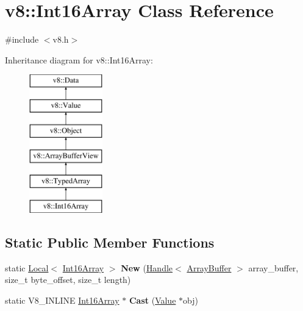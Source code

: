 \hypertarget{classv8_1_1_int16_array}{}\section{v8\+:\+:Int16\+Array Class Reference}
\label{classv8_1_1_int16_array}


{\ttfamily \#include $<$v8.\+h$>$}

Inheritance diagram for v8\+:\+:Int16\+Array\+:\begin{figure}[H]
\begin{center}
\leavevmode
\includegraphics[height=6.000000cm]{classv8_1_1_int16_array}
\end{center}
\end{figure}
\subsection*{Static Public Member Functions}
\begin{DoxyCompactItemize}
\item 
\hypertarget{classv8_1_1_int16_array_adc49fddf7e0b2c719085f5f9af3762e5}{}static \hyperlink{classv8_1_1_local}{Local}$<$ \hyperlink{classv8_1_1_int16_array}{Int16\+Array} $>$ {\bfseries New} (\hyperlink{classv8_1_1_local}{Handle}$<$ \hyperlink{classv8_1_1_array_buffer}{Array\+Buffer} $>$ array\+\_\+buffer, size\+\_\+t byte\+\_\+offset, size\+\_\+t length)\label{classv8_1_1_int16_array_adc49fddf7e0b2c719085f5f9af3762e5}

\item 
\hypertarget{classv8_1_1_int16_array_abef12f11ace9c74a4ce451db28b954e5}{}static V8\+\_\+\+I\+N\+L\+I\+N\+E \hyperlink{classv8_1_1_int16_array}{Int16\+Array} $\ast$ {\bfseries Cast} (\hyperlink{classv8_1_1_value}{Value} $\ast$obj)\label{classv8_1_1_int16_array_abef12f11ace9c74a4ce451db28b954e5}

\end{DoxyCompactItemize}
